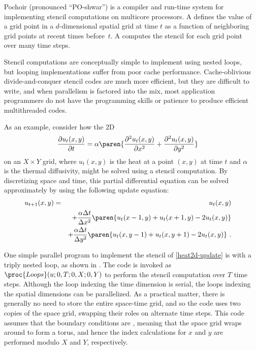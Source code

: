 
Pochoir (pronounced ``PO-shwar'') is a compiler and run-time system
for implementing stencil computations on multicore processors.  A
 defines the value of a grid point in a $d$-dimensional
spatial grid at time $t$ as a function of neighboring grid points at
recent times before~$t$.  A 
\cite{FrigoSt05, FrigoSt09, DattaMuVo08, KamilShDa06, KamilShHu05, Nitsure06,
KrishnamoorthyBaBo07, DursunNoWa09, PengSeNo09, DursunNoPe09, BleckRoDi92,
NakanoKaVa92, TafloveHa00, WilliamsCaOl08 }
computes the stencil for each grid point over many time
steps.

Stencil computations are conceptually simple to implement using nested
loops, but looping implementations suffer from poor cache performance.
Cache-oblivious \cite{FrigoLePr99,Prokop99} divide-and-conquer stencil
codes \cite{FrigoSt05, FrigoSt09} are much more efficient, but they
are difficult to write, and when parallelism is factored into the mix,
most application programmers do not have the programming skills or
patience to produce efficient multithreaded codes.

As an example, consider how the 2D
 \cite{Epperson07}
\begin{equation}
  \frac{\partial u_t(x,y)}{\partial t} 
    = \alpha \paren{\frac{\partial^2 u_t(x,y)}{ \partial x^2} 
      + \frac{\partial^2 u_t(x,y)}{ \partial y^2}}
      \label{eq:heat2d}
\end{equation}
on an $X\times Y$ grid, where $u_t(x,y)$ is the heat at a point
$(x,y)$ at time $t$ and $\alpha$ is the thermal diffusivity, might be
solved using a stencil computation.  By discretizing space and time,
this partial differential equation can be solved approximately by
using the following update equation:
\begin{eqnarray}
  u_{t+1}(x,y)  & = & u_t(x,y) \nonumber\\
  & & +  \frac{\alpha \Delta t}{\Delta x^2}
  \paren{ u_t(x-1,y) + u_t(x+1,y) - 2 u_t(x,y)}\nonumber \\
  & &  + \frac{\alpha \Delta t}{\Delta y^2} 
  \paren{u_t(x,y-1) + u_t(x,y+1) - 2u_t(x,y)} \ .
  \label{eq:heat2d-update}
\end{eqnarray}
  
One simple parallel program to implement the stencil of
\eqref{heat2d-update} is with a triply nested loop, as shown in
.  The code is invoked as $\proc{Loops}(u; 0, T; 0,
X; 0, Y)$ to perform the stencil computation over $T$ time steps.
Although the loop indexing the time dimension is serial, the loops
indexing the spatial dimensions can be parallelized.  As a practical
matter, there is generally no need to store the entire space-time
grid, and so the code uses two copies of the space grid, swapping
their roles on alternate time steps.  This code assumes that the
boundary conditions are , meaning that the space grid
wraps around to form a torus, and hence the index calculations for $x$
and $y$ are performed modulo $X$ and $Y$, respectively.

